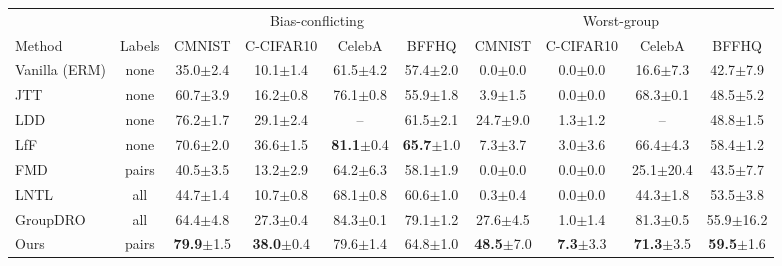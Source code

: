 \begin{tabular}{lccccccccc}
\toprule
 &  & \multicolumn{4}{c}{Bias-conflicting} & \multicolumn{4}{c}{Worst-group} \\
\cmidrule(lr){3-6}\cmidrule(lr){7-10}
Method & Labels & CMNIST & C-CIFAR10 & CelebA & BFFHQ & CMNIST & C-CIFAR10 & CelebA & BFFHQ \\
\midrule
Vanilla (ERM) & none & 35.0{\scriptsize$\pm$2.4} & 10.1{\scriptsize$\pm$1.4} & 61.5{\scriptsize$\pm$4.2} & 57.4{\scriptsize$\pm$2.0} & 0.0{\scriptsize$\pm$0.0} & 0.0{\scriptsize$\pm$0.0} & 16.6{\scriptsize$\pm$7.3} & 42.7{\scriptsize$\pm$7.9} \\
JTT~\cite{liu2021jtt} & none & 60.7{\scriptsize$\pm$3.9} & 16.2{\scriptsize$\pm$0.8} & 76.1{\scriptsize$\pm$0.8} & 55.9{\scriptsize$\pm$1.8} & 3.9{\scriptsize$\pm$1.5} & 0.0{\scriptsize$\pm$0.0} & 68.3{\scriptsize$\pm$0.1} & 48.5{\scriptsize$\pm$5.2} \\
LDD~\cite{lee2021ldd} & none & 76.2{\scriptsize$\pm$1.7} & 29.1{\scriptsize$\pm$2.4} & – & 61.5{\scriptsize$\pm$2.1} & 24.7{\scriptsize$\pm$9.0} & 1.3{\scriptsize$\pm$1.2} & – & 48.8{\scriptsize$\pm$1.5} \\
LfF~\cite{nam2020lff} & none & 70.6{\scriptsize$\pm$2.0} & 36.6{\scriptsize$\pm$1.5} & \textbf{81.1}{\scriptsize$\pm$0.4} & \textbf{65.7}{\scriptsize$\pm$1.0} & 7.3{\scriptsize$\pm$3.7} & 3.0{\scriptsize$\pm$3.6} & 66.4{\scriptsize$\pm$4.3} & 58.4{\scriptsize$\pm$1.2} \\
FMD~\cite{chen2023fmd} & pairs & 40.5{\scriptsize$\pm$3.5} & 13.2{\scriptsize$\pm$2.9} & 64.2{\scriptsize$\pm$6.3} & 58.1{\scriptsize$\pm$1.9} & 0.0{\scriptsize$\pm$0.0} & 0.0{\scriptsize$\pm$0.0} & 25.1{\scriptsize$\pm$20.4} & 43.5{\scriptsize$\pm$7.7} \\
LNTL~\cite{kim2019lntl} & all & 44.7{\scriptsize$\pm$1.4} & 10.7{\scriptsize$\pm$0.8} & 68.1{\scriptsize$\pm$0.8} & 60.6{\scriptsize$\pm$1.0} & 0.3{\scriptsize$\pm$0.4} & 0.0{\scriptsize$\pm$0.0} & 44.3{\scriptsize$\pm$1.8} & 53.5{\scriptsize$\pm$3.8} \\
GroupDRO~\cite{sagawa2020groupdro} & all & 64.4{\scriptsize$\pm$4.8} & 27.3{\scriptsize$\pm$0.4} & 84.3{\scriptsize$\pm$0.1} & 79.1{\scriptsize$\pm$1.2} & 27.6{\scriptsize$\pm$4.5} & 1.0{\scriptsize$\pm$1.4} & 81.3{\scriptsize$\pm$0.5} & 55.9{\scriptsize$\pm$16.2} \\
Ours & pairs & \textbf{79.9}{\scriptsize$\pm$1.5} & \textbf{38.0}{\scriptsize$\pm$0.4} & 79.6{\scriptsize$\pm$1.4} & 64.8{\scriptsize$\pm$1.0} & \textbf{48.5}{\scriptsize$\pm$7.0} & \textbf{7.3}{\scriptsize$\pm$3.3} & \textbf{71.3}{\scriptsize$\pm$3.5} & \textbf{59.5}{\scriptsize$\pm$1.6} \\
\bottomrule
\end{tabular}
